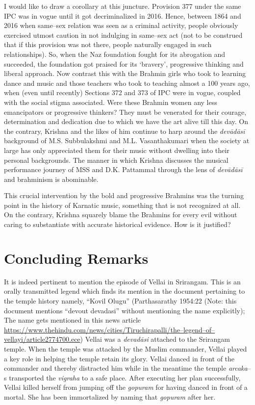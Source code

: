 I would like to draw a corollary at this juncture. Provision 377 under the same IPC was in vogue until it got decriminalized in 2016. Hence, between 1864 and 2016 when same–sex relation was seen as a criminal activity, people obviously exercised utmost caution in not indulging in same–sex act (not to be construed that if this provision was not there, people naturally engaged in such relationships). So, when the Naz foundation fought for its abrogation and succeeded, the foundation got praised for its ‘bravery’, progressive thinking and liberal approach. Now contrast this with the Brahmin girls who took to learning dance and music and those teachers who took to teaching almost a 100 years ago, when (even until recently) Sections 372 and 373 of IPC were in vogue, coupled with the social stigma associated. Were these Brahmin women any less emancipators or progressive thinkers? They must be venerated for their courage, determination and dedication due to which we have the art alive till this day. On the contrary, Krishna and the likes of him continue to harp around the \textit{devādāsī }background of M.S. Subbulakshmi and M.L. Vasanthakumari when the society at large has only appreciated them for their music without dwelling into their personal backgrounds. The manner in which Krishna discusses the musical performance journey of MSS and D.K. Pattammal through the lens of \textit{devādāsī }and brahminism is abominable.

This crucial intervention by the bold and progressive Brahmins was the turning point in the history of Karnatic music, something that is not recognized at all. On the contrary, Krishna squarely blame the Brahmins for every evil without caring to substantiate with accurate historical evidence. How is it justified?


\section*{Concluding Remarks}

It is indeed pertinent to mention the episode of Vellai in Srirangam. This is an orally transmitted legend which finds its mention in the document pertaining to the temple history namely, “Kovil Olugu” (Parthasarathy 1954:22 (Note: this document mentions “devout devadasi” without mentioning the name explicitly); The name gets mentioned in this news article \url{https://www.thehindu.com/news/cities/Tiruchirapalli/the–legend–of–vellayi/article2774700.ece}) Vellai was a \textit{devadāsi} attached to the Srirangam temple. When the temple was attacked by the Muslim commander, Vellai played a key role in helping the temple retain its glory. Vellai danced in front of the commander and thereby distracted him while in the meantime the temple \textit{arcaka}–s transported the \textit{vigraha} to a safe place. After executing her plan successfully, Vellai killed herself from jumping off the \textit{gopuram} for having danced in front of a mortal. She has been immortalized by naming that \textit{gopuram} after her.

